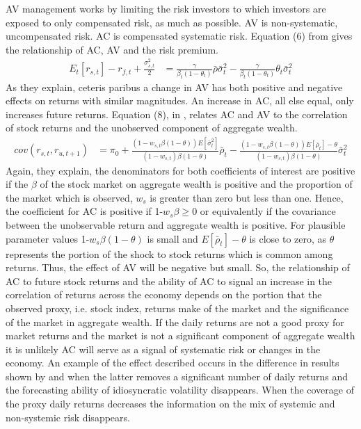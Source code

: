 AV management works by limiting the risk investors to which investors are exposed to only compensated risk, as much as possible. AV is non-systematic, uncompensated risk. AC is compensated systematic risk. Equation (6) from \citet{pollet_average_2010} gives the relationship of AC, AV and the risk premium.
\begin{align*}
	E_{t}[r_{s,t}] - r_{f,t} + \frac{\sigma^{2}_{s,t}}{2} &= \frac{\gamma}{\beta_{t}(1-\theta_{t})}\bar{\rho}\bar{\sigma}^{2}_{t} - \frac{\gamma}{\beta_{t}(1-\theta_{t})}\theta_{t}\bar{\sigma}^{2}_{t}
\end{align*}
As they explain, ceteris paribus a change in AV has both positive and negative effects on returns with similar magnitudes. An increase in AC, all else equal, only increases future returns. Equation (8), in \cite{pollet_average_2010}, relates AC and AV to the correlation of stock returns and the unobserved component of aggregate wealth.
\begin{align*}
cov(r_{s,t},r_{u,t+1}) &= \pi_{0} + \frac{(1-w_{s,t}\beta(1-\theta))E[\bar{\sigma}^{2}_{t}]}{(1-w_{s,t})\beta(1-\theta)}\bar{\rho}_{t}- \frac{(1-w_{s,t}\beta(1-\theta))E[\bar{\rho}_{t}]-\theta}{(1-w_{s,t})\beta(1-\theta)}\bar{\sigma}^{2}_{t}
\end{align*}
Again, they explain, the denominators for both coefficients of interest are positive if the $\beta$ of the stock market on aggregate wealth is positive and the proportion of the market which is observed, $w_{s}$ is greater than zero but less than one. Hence, the coefficient for AC is positive if 1-$w_{s}\beta \geq 0$ or equivalently if the covariance between the unobservable return and aggregate wealth is positive. For plausible parameter values 1-$w_{s}\beta(1-\theta)$ is small and $E[\bar{\rho}_{t}]-\theta$ is close to zero, as $\theta$ represents the portion of the shock to stock returns which is common among returns. Thus, the effect of AV will be negative but small. So, the relationship of AC to future stock returns and the ability of AC to signal an increase in the correlation of returns across the economy depends on the portion that the observed proxy, i.e. stock index, returns make of the market and the significance of the market in aggregate wealth. If the daily returns are not a good proxy for market returns and the market is not a significant component of aggregate wealth it is unlikely AC will serve as a signal of systematic risk or changes in the economy. An example of the effect described occurs in the difference in results shown by \citet{goyal_idiosyncratic_2003} and \citet{bali_does_nodate} when the latter removes a significant number of daily returns and the forecasting ability of idiosyncratic volatility disappears. When the coverage of the proxy daily returns decreases the information on the mix of systemic and non-systemic risk disappears.


